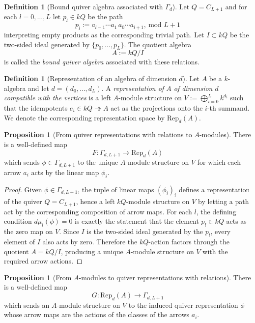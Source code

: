 \documentclass{article}
\theoremstyle{definition}
\newtheorem{proposition}[theorem]{Proposition}
\newtheorem{definition}[theorem]{Definition}
\begin{document}
\begin{definition}[Bound quiver algebra associated with $\Gamma_d$]
Let $Q=C_{L+1}$ and for each $l=0,\ldots,L$ let $p_l\in kQ$ be the path
\[
 p_l := a_{l-1}\cdots a_1\,a_{0}\cdots a_{l+1},\ \text{mod } L+1
\]
interpreting empty products as the corresponding trivial path.
Let $I\subset kQ$ be the two-sided ideal generated by $\{p_0,\ldots,p_{L}\}$.
The quotient algebra
\[
A:=kQ/I
\]
is called the \emph{bound quiver algebra} associated with these relations.
\end{definition}

\begin{definition}[Representation of an algebra of dimension $d$]
Let $A$ be a $k$-algebra and let $d=(d_0,\ldots,d_L)$.
A \emph{representation of $A$ of dimension $d$ compatible with the vertices} is a left $A$-module structure on
$V:=\bigoplus_{i=0}^L k^{d_i}$ such that the idempotents $e_i\in kQ\twoheadrightarrow A$ act as the projections onto the $i$-th summand.
We denote the corresponding representation space by $\mathrm{Rep}_d(A)$.
\end{definition}

\begin{proposition}[From quiver representations with relations to $A$-modules]
There is a well-defined map
\[
F:\Gamma_{d,L+1}\to \mathrm{Rep}_d(A)
\]
which sends $\phi\in\Gamma_{d,L+1}$ to the unique $A$-module structure on $V$ for which each arrow $a_i$ acts by the linear map $\phi_i$.
\end{proposition}

\begin{proof}
Given $\phi\in\Gamma_{d,L+1}$, the tuple of linear maps $(\phi_i)_i$ defines a representation of the quiver $Q=C_{L+1}$, hence a left $kQ$-module structure on $V$ by letting a path act by the corresponding composition of arrow maps.
For each $l$, the defining condition $d\mu_l(\phi)=0$ is exactly the statement that the element $p_l\in kQ$ acts as the zero map on $V$.
Since $I$ is the two-sided ideal generated by the $p_l$, every element of $I$ also acts by zero.
Therefore the $kQ$-action factors through the quotient $A=kQ/I$, producing a unique $A$-module structure on $V$ with the required arrow actions.
\end{proof}

\begin{proposition}[From $A$-modules to quiver representations with relations]
There is a well-defined map
\[
G:\mathrm{Rep}_d(A)\to \Gamma_{d,L+1}
\]
which sends an $A$-module structure on $V$ to the induced quiver representation $\phi$ whose arrow maps are the actions of the classes of the arrows $a_i$.
\end{proposition}
\end{document}
